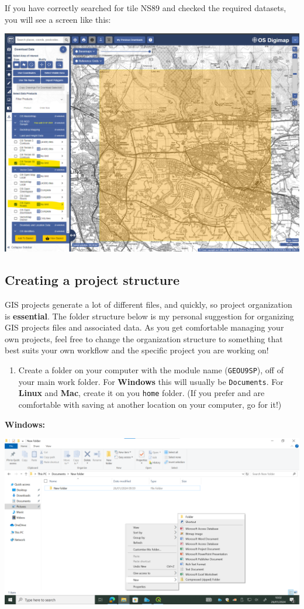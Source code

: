 \documentclass[
  letterpaper,
  DIV=11,
  numbers=noendperiod]{scrreprt}
\providecommand{\tightlist}{%
  \setlength{\itemsep}{0pt}\setlength{\parskip}{0pt}}\usepackage{longtable,booktabs,array}
\begin{document}
If you have correctly searched for tile NS89 and checked the required
datasets, you will see a screen like this:

\includegraphics{images/lab_1/lab1_digimap.png}

\subsection{Creating a project
structure}\label{creating-a-project-structure}

GIS projects generate a lot of different files, and quickly, so project
organization is \textbf{essential}. The folder structure below is my
personal suggestion for organizing GIS projects files and associated
data. As you get comfortable managing your own projects, feel free to
change the organization structure to something that best suits your own
workflow and the specific project you are working on!

\begin{enumerate}
\def\labelenumi{(\arabic{enumi})}
\setcounter{enumi}{3}
\tightlist
\item
  Create a folder on your computer with the module name
  (\texttt{GEOU9SP}), off of your main work folder. For \textbf{Windows}
  this will usually be \texttt{Documents}. For \textbf{Linux} and
  \textbf{Mac}, create it on you \texttt{home} folder. (If you prefer
  and are comfortable with saving at another location on your computer,
  go for it!)
\end{enumerate}

\textbf{Windows:}

\includegraphics{images/lab_1/lab1_fig3_wincfolder.png}
\end{document}
